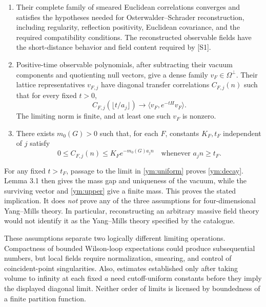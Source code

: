 \documentclass[11pt]{article}
\begin{document}
\begin{enumerate}
\item Their complete family of smeared Euclidean correlations converges and
 satisfies the hypotheses needed for Osterwalder--Schrader reconstruction,
 including regularity, reflection positivity, Euclidean covariance, and
 the required compatibility conditions. The reconstructed observable fields
 have the short-distance behavior and field content required by [S1].
\item Positive-time observable polynomials, after subtracting their vacuum
 components and quotienting null vectors, give a dense family
 $v_F\in\Omega^\perp$. Their lattice representatives $v_{F,j}$ have diagonal
 transfer correlations $C_{F,j}(n)$ such that for every fixed $t>0$,
\[
 C_{F,j}(\lfloor t/a_j\rfloor)
 \longrightarrow\langle v_F,e^{-tH}v_F\rangle.
\]
The limiting norm is finite, and at least one such $v_F$ is nonzero.
\item There exists $m_0(G)>0$ such that, for each $F$, constants $K_F,t_F$
 independent of $j$ satisfy
\begin{equation}\label{ym:uniform}
 0\leq C_{F,j}(n)\leq K_F e^{-m_0(G)a_jn}
 \quad\text{whenever }a_jn\geq t_F.
\end{equation}
\end{enumerate}

For any fixed $t>t_F$, passage to the limit in \eqref{ym:uniform} proves
 \eqref{ym:decay}. Lemma 3.1 then gives the mass gap and uniqueness of the
 vacuum, while the surviving vector and \eqref{ym:upper} give a finite mass.
 This proves the stated implication. It does \emph{not} prove any of the
 three assumptions for four-dimensional Yang--Mills theory. In particular,
 reconstructing an arbitrary massive field theory would not identify it as
 the Yang--Mills theory specified by the catalogue.

These assumptions separate two logically different limiting operations.
 Compactness of bounded Wilson-loop expectations could produce subsequential
 numbers, but local fields require normalization, smearing, and control of
 coincident-point singularities. Also, estimates established only after taking
 volume to infinity at each fixed $a$ need cutoff-uniform constants before
 they imply the displayed diagonal limit. Neither order of limits is licensed
 by boundedness of a finite partition function.
\end{document}
